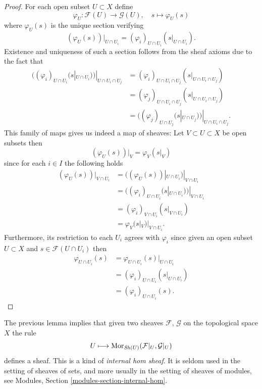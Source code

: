 \begin{proof}
For each open subset $U \subset X$ define
$$
\varphi_U : \mathcal{F}(U) \to \mathcal{G}(U), \quad
s \mapsto \varphi_U(s)
$$
where $\varphi_U(s)$ is the unique section verifying
$$
(\varphi_U(s))|_{U \cap U_i}
= (\varphi_i)_{U \cap U_i}(s|_{U \cap U_i}).
$$
Existence and uniqueness of such a section
follows from the sheaf axioms
due to the fact that
\begin{align*}
((\varphi_i)_{U \cap U_i}(s|_{U \cap U_i}))|_{U \cap U_i \cap U_j}
&= (\varphi_i)_{U \cap U_i \cap U_j}(s|_{U \cap U_i \cap U_j})\\
&= (\varphi_j)_{U \cap U_i \cap U_j}(s|_{U \cap U_i \cap U_j})\\
&= ((\varphi_j)_{U \cap U_j}(s|_{U \cap U_j}))|_{U \cap U_i \cap U_j}.
\end{align*}
This family of maps gives us indeed a map of sheaves:
Let $V \subset U \subset X$ be open subsets then
$$
(\varphi_U(s))|_V
= \varphi_V(s|_V)
$$
since for each $i \in I$ the following holds
\begin{align*}
(\varphi_U(s))|_{V \cap U_i}
&= ((\varphi_U(s))|_{U \cap U_i})|_{V \cap U_i}\\
&= ((\varphi_i)_{U \cap U_i}(s|_{U \cap U_i}))|_{V \cap U_i}\\
&= (\varphi_i)_{V \cap U_i}(s|_{V \cap U_i})\\
&= \varphi_V(s|_V)|_{V \cap U_i}.
\end{align*}
Furthermore,
its restriction to each $U_i$ agrees with $\varphi_i$
since given an open subset $U \subset X$
and $s \in \mathcal{F}(U \cap U_i)$ then
\begin{align*}
\varphi_{U \cap U_i}(s)
&= \varphi_{U \cap U_i}(s)|_{U \cap U_i}\\
&= (\varphi_i)_{U \cap U_i}(s|_{U \cap U_i})\\
&= (\varphi_i)_{U \cap U_i}(s).
\end{align*}
\end{proof}

\noindent
The previous lemma implies that given two sheaves $\mathcal{F}$,
$\mathcal{G}$ on the topological space $X$ the rule
$$
U \longmapsto
\mathop{\mathrm{Mor}}\nolimits_{\mathop{\mathit{Sh}}\nolimits(U)}(
\mathcal{F}|_U, \mathcal{G}|_U)
$$
defines a sheaf. This is a kind of {\it internal hom sheaf}. It is
seldom used in the setting of sheaves of sets, and more usually
in the setting of sheaves of modules, see
Modules, Section \ref{modules-section-internal-hom}.

